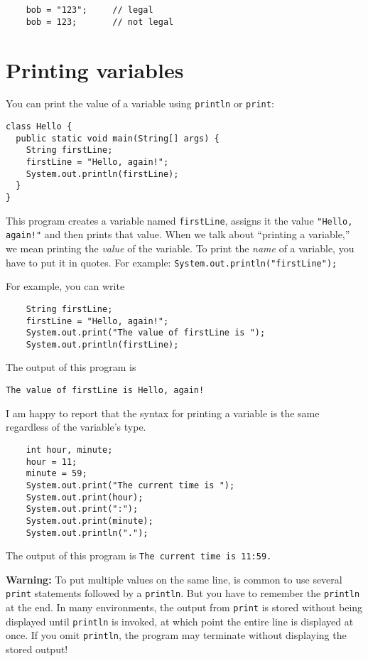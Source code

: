 \documentclass[12pt]{book}
\def\WARNING{\textbf{Warning:}}
\theoremstyle{definition}
\begin{document}
\begin{lstlisting}
    bob = "123";     // legal
    bob = 123;       // not legal
\end{lstlisting}


\section{Printing variables}
\label{printing}

You can print the value of a variable using {\tt println} or
{\tt print}:

\begin{lstlisting}
class Hello {
  public static void main(String[] args) {
    String firstLine;
    firstLine = "Hello, again!";
    System.out.println(firstLine);
  }
}
\end{lstlisting}
%
This program creates a variable named {\tt firstLine}, assigns
it the value {\tt "Hello, again!"} and then prints that value.
When we talk about ``printing a variable,'' we mean printing
the {\em value} of the variable.  To print the {\em name} of
a variable, you have to put it in quotes.
For example: {\tt System.out.println("firstLine");}

For example, you can write

\begin{lstlisting}
    String firstLine;
    firstLine = "Hello, again!";
    System.out.print("The value of firstLine is ");
    System.out.println(firstLine);
\end{lstlisting}
%
The output of this program is

\begin{lstlisting}
The value of firstLine is Hello, again!
\end{lstlisting}
%
I am happy to report that the syntax for printing a variable
is the same regardless of the variable's type.

\begin{lstlisting}
    int hour, minute;
    hour = 11;
    minute = 59;
    System.out.print("The current time is ");
    System.out.print(hour);
    System.out.print(":");
    System.out.print(minute);
    System.out.println(".");
\end{lstlisting}
%
The output of this program is {\tt The current time is 11:59.}

\WARNING{} To put multiple values
on the same line, is common to use several {\tt print} statements
followed by a {\tt println}.
But you have to remember
the {\tt println} at the end.  In many environments, the
output from {\tt print} is stored without being displayed until
{\tt println} is invoked, at which point the entire
line is displayed at once.  If you omit {\tt println}, the
program may terminate without displaying the stored output!
\end{document}
